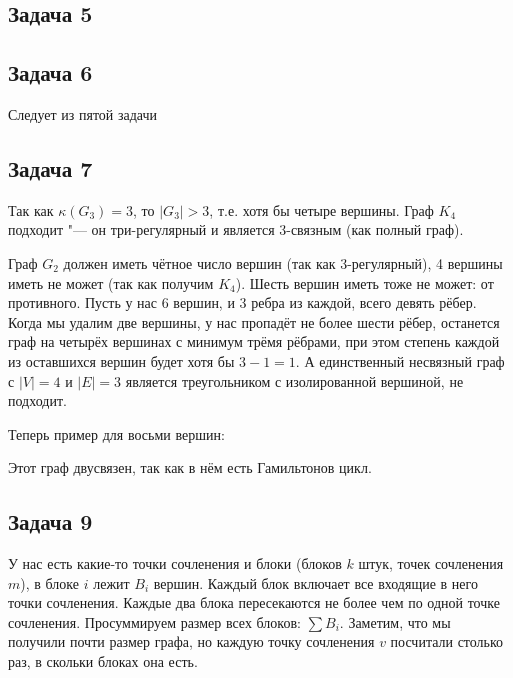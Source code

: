 	\begin{center}
	\end{center}

\subsection{Задача 5}
	\TODO
	
\subsection{Задача 6}
	Следует из пятой задачи

\subsection{Задача 7}
	Так как $\kappa(G_3)=3$, то $|G_3|>3$, т.е. хотя бы четыре вершины.
	Граф $K_4$ подходит "--- он три-регулярный и является 3-связным (как полный граф).

	Граф $G_2$ должен иметь чётное число вершин (так как 3-регулярный), 4 вершины
	иметь не может (так как получим $K_4$).
	Шесть вершин иметь тоже не может: от противного.
	Пусть у нас 6 вершин, и 3 ребра из каждой, всего девять рёбер.
	Когда мы удалим две вершины, у нас пропадёт не более шести рёбер,
	останется граф на четырёх вершинах с минимум трёмя рёбрами,
	при этом степень каждой из оставшихся вершин будет хотя бы $3-1=1$.
	А единственный несвязный граф с $|V|=4$ и $|E|=3$ является треугольником с изолированной вершиной, не подходит.

	Теперь пример для восьми вершин:

	\begin{center}
	\end{center}

	Этот граф двусвязен, так как в нём есть Гамильтонов цикл.

\subsection{Задача 9}
	У нас есть какие-то точки сочленения и блоки (блоков $k$ штук, точек сочленения $m$),
	в блоке $i$ лежит $B_i$ вершин.
	Каждый блок включает все входящие в него точки сочленения.
	Каждые два блока пересекаются не более чем по одной точке сочленения.
	Просуммируем размер всех блоков: $\sum B_i$.
	Заметим, что мы получили почти размер графа, но каждую точку сочленения $v$
	посчитали столько раз, в скольки блоках она есть.

